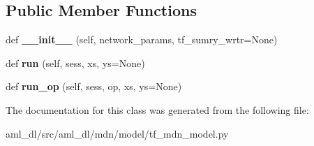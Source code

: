\subsection*{Public Member Functions}
\begin{DoxyCompactItemize}
\item 
\hypertarget{classsrc_1_1aml__dl_1_1mdn_1_1model_1_1tf__mdn__model_1_1_mixture_density_network_a7eab35ab68aa1aa684c60b78e9ece40b}{}\label{classsrc_1_1aml__dl_1_1mdn_1_1model_1_1tf__mdn__model_1_1_mixture_density_network_a7eab35ab68aa1aa684c60b78e9ece40b} 
def {\bfseries \+\_\+\+\_\+init\+\_\+\+\_\+} (self, network\+\_\+params, tf\+\_\+sumry\+\_\+wrtr=None)
\item 
\hypertarget{classsrc_1_1aml__dl_1_1mdn_1_1model_1_1tf__mdn__model_1_1_mixture_density_network_adbc84b7d2f9224f1ead2afeb689e8560}{}\label{classsrc_1_1aml__dl_1_1mdn_1_1model_1_1tf__mdn__model_1_1_mixture_density_network_adbc84b7d2f9224f1ead2afeb689e8560} 
def {\bfseries run} (self, sess, xs, ys=None)
\item 
\hypertarget{classsrc_1_1aml__dl_1_1mdn_1_1model_1_1tf__mdn__model_1_1_mixture_density_network_aba8d637002a429139c9c2e8f455fc430}{}\label{classsrc_1_1aml__dl_1_1mdn_1_1model_1_1tf__mdn__model_1_1_mixture_density_network_aba8d637002a429139c9c2e8f455fc430} 
def {\bfseries run\+\_\+op} (self, sess, op, xs, ys=None)
\end{DoxyCompactItemize}


The documentation for this class was generated from the following file\+:\begin{DoxyCompactItemize}
\item 
aml\+\_\+dl/src/aml\+\_\+dl/mdn/model/tf\+\_\+mdn\+\_\+model.\+py\end{DoxyCompactItemize}
